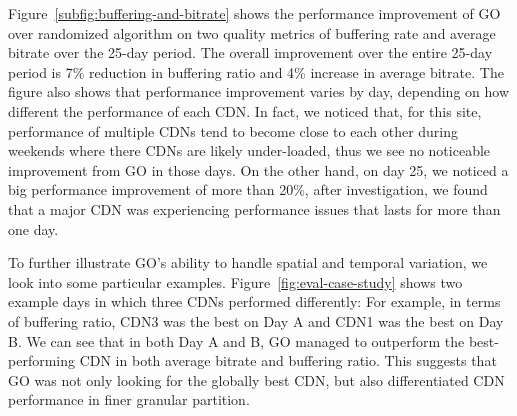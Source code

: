 Figure~\ref{subfig:buffering-and-bitrate} shows the performance improvement of GO over randomized algorithm on two quality metrics of
buffering rate and average bitrate over the 25-day period. The overall improvement over the entire 25-day period is 7\% reduction in buffering ratio and 4\% increase in 
average bitrate. The figure also shows that performance improvement varies by day, depending on how different the performance of each CDN. 
In fact, we noticed that, for this site, performance of multiple CDNs tend to become close to each other
during weekends where there CDNs are likely under-loaded, thus we see no noticeable improvement from GO in those days. 
On the other hand, on day 25, we noticed a big performance improvement of more than 20\%, after investigation,
we found that a major CDN was experiencing performance issues that lasts for more than one day. 

To further illustrate GO's ability to handle spatial and temporal variation, 
we look into some particular examples. Figure~\ref{fig:eval-case-study} shows two example days in which three CDNs performed differently: 
For example, in terms of buffering ratio, CDN3 was the best on Day A and CDN1 was the best on Day B. 
We can see that in both Day A and B, GO managed to outperform the best-performing CDN in both average bitrate 
and buffering ratio. This suggests that GO was not only looking for the globally best CDN, but also 
differentiated CDN performance in finer granular partition.


\begin{figure}[t!]
\centering
{}
\label{fig:perf-impr}
\end{figure}

